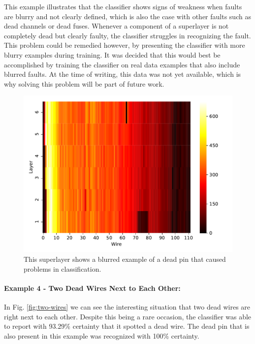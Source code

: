 This example illustrates that the classifier shows signs of weakness
when faults are blurry and not clearly defined, which is
also the case with other faults such as dead channels or dead
fuses. Whenever a component of a superlayer is not completely dead but
clearly faulty, the classifier struggles in recognizing the
fault. This problem could be remedied however, by presenting the
classifier with more blurry examples during training. It was decided
that this would best be accomplished by training the classifier on
real data examples that also include blurred faults. At the time of
writing, this data was not yet available, which is why solving this
problem will be part of future work.

\begin{figure}
  \includegraphics[width=\textwidth]{../figures/small_pin_fail}
  \caption{This superlayer shows a blurred example of a dead pin that
    caused problems in classification.}
  \label{fig:pin-failure}
\end{figure}

\clearpage

\paragraph{Example 4 - Two Dead Wires Next to Each Other:}

In Fig. \ref{fig:two-wires} we can see the interesting situation that
two dead wires are right next to each other. Despite this being a rare
occasion, the classifier was able to report with 93.29\% certainty
that it spotted a dead wire. The dead pin that is also present in this
example was recognized with 100\% certainty.

